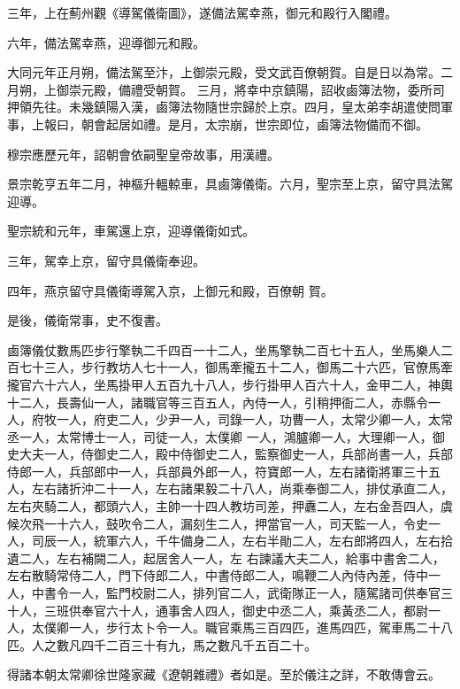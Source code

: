 \begin{pinyinscope}
 三年，上在薊州觀《導駕儀衛圖》，遂備法駕幸燕，御元和殿行入閣禮。



 六年，備法駕幸燕，迎導御元和殿。



 大同元年正月朔，備法駕至汴，上御崇元殿，受文武百僚朝賀。自是日以為常。二月朔，上御崇元殿，備禮受朝賀。
 三月，將幸中京鎮陽，詔收鹵簿法物，委所司押領先往。未幾鎮陽入漢，鹵簿法物隨世宗歸於上京。四月，皇太弟李胡遣使問軍事，上報曰，朝會起居如禮。是月，太宗崩，世宗即位，鹵簿法物備而不御。



 穆宗應歷元年，詔朝會依嗣聖皇帝故事，用漢禮。



 景宗乾亨五年二月，神樞升轀輬車，具鹵簿儀衛。六月，聖宗至上京，留守具法駕迎導。



 聖宗統和元年，車駕還上京，迎導儀衛如式。



 三年，駕幸上京，留守具儀衛奉迎。



 四年，燕京留守具儀衛導駕入京，上御元和殿，百僚朝
 賀。



 是後，儀衛常事，史不復書。



 鹵簿儀仗數馬匹步行擎執二千四百一十二人，坐馬擎執二百七十五人，坐馬樂人二百七十三人，步行教坊人七十一人，御馬牽攏五十二人，御馬二十六匹，官僚馬牽攏官六十六人，坐馬掛甲人五百九十八人，步行掛甲人百六十人，金甲二人，神輿十二人，長壽仙一人，諸職官等三百五人，內侍一人，引稍押衙二人，赤縣令一人，府牧一人，府吏二人，少尹一人，司錄一人，功曹一人，太常少卿一人，太常丞一人，太常博士一人，司徒一人，太僕卿
 一人，鴻臚卿一人，大理卿一人，御史大夫一人，侍御史二人，殿中侍御史二人，監察御史一人，兵部尚書一人，兵部侍郎一人，兵部郎中一人，兵部員外郎一人，符寶郎一人，左右諸衛將軍三十五人，左右諸折沖二十一人，左右諸果毅二十八人，尚乘奉御二人，排仗承直二人，左右夾騎二人，都頭六人，主帥一十四人教坊司差，押纛二人，左右金吾四人，虞候次飛一十六人，鼓吹令二人，漏刻生二人，押當官一人，司天監一人，令史一人，司辰一人，統軍六人，千牛備身二人，左右半勛二人，左右郎將四人，左右拾遺二人，左右補闕二人，起居舍人一人，左
 右諫議大夫二人，給事中書舍二人，左右散騎常侍二人，門下侍郎二人，中書侍郎二人，鳴鞭二人內侍內差，侍中一人，中書令一人，監門校尉二人，排列官二人，武衛隊正一人，隨駕諸司供奉官三十人，三班供奉官六十人，通事舍人四人，御史中丞二人，乘黃丞二人，都尉一人，太僕卿一人，步行太卜令一人。職官乘馬三百四匹，進馬四匹，駕車馬二十八匹。人之數凡四千二百三十有九，馬之數凡千五百二十。



 得諸本朝太常卿徐世隆家藏《遼朝雜禮》者如是。至於儀注之詳，不敢傳會云。



\end{pinyinscope}